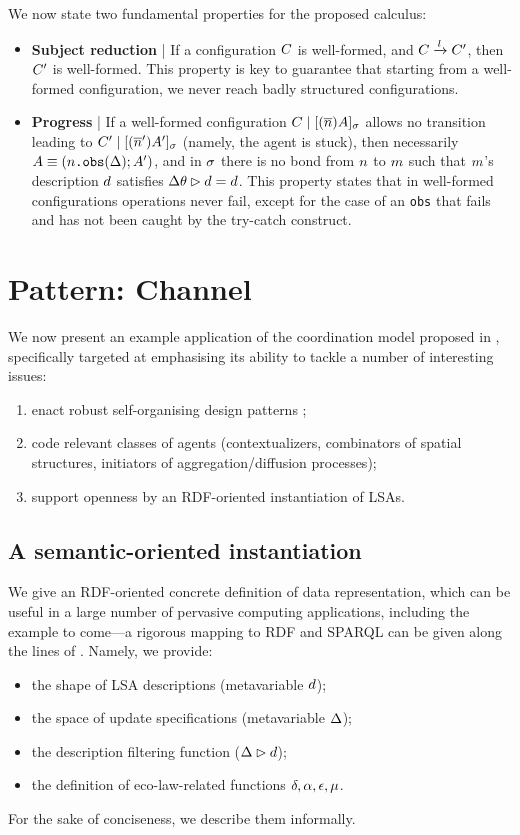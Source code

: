 \documentclass[12pt,a4paper,twoside,openright]{book}
\begin{document}
We now state two fundamental properties for the proposed calculus:
%
\begin{itemize}
 \item \textbf{Subject reduction} | If a configuration $C$ is well-formed, and $C\xrightarrow{l}C'$, then $C'$ is well-formed. This property is key to guarantee that starting from a well-formed configuration, we never reach badly structured configurations.

 \item \textbf{Progress} | If a well-formed configuration $C\;|\;[(\overline{n})A]_{\sigma}$ allows no transition leading to $C'\;|\;[(\overline{n}')A']_{\sigma}$ (namely, the agent is stuck), then necessarily $A\equiv(n\texttt{.obs}(\Delta);A')$, and in $\sigma$ there is no bond from $n$ to $m$ such that $m$'s description $d$ satisfies $\Delta\theta\rhd d=d$. This property states that in well-formed configurations operations never fail, except for the case of an \texttt{obs} that fails and has not been caught by the try-catch construct.
\end{itemize}

\section{Pattern: Channel}

We now present an example application of the coordination model proposed in , specifically targeted at emphasising its ability to tackle a number of interesting issues:
\begin{enumerate}
 \item enact robust self-organising design patterns \cite{FDMVA-NACO2012};
 \item code relevant classes of agents (contextualizers, combinators of spatial structures, initiators of aggregation/diffusion processes);
 \item support openness by an RDF-oriented instantiation of LSAs.
\end{enumerate}

\subsection{A semantic-oriented instantiation}

We give an RDF-oriented concrete definition of data representation, which can be useful in a large number of pervasive computing applications, including the example to come---a rigorous mapping to RDF and SPARQL can be given along the lines of \cite{SemanticSapereIGI2012}.
%
Namely, we provide:
\begin{itemize}
 \item the shape of LSA descriptions (metavariable $d$);
 \item the space of update specifications (metavariable $\Delta$);
 \item the description filtering function ($\Delta\rhd d$);
 \item the definition of eco-law-related functions $\delta,\alpha,\epsilon,\mu$.
\end{itemize}
For the sake of conciseness, we describe them informally.
\end{document}
